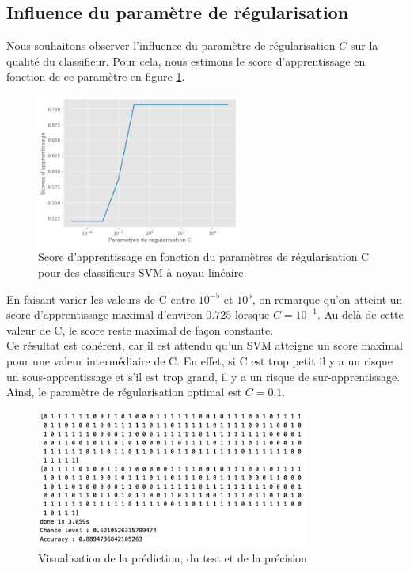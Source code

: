 \documentclass[a4paper,12pt]{article}
\begin{document}
\subsection{Influence du paramètre de régularisation}

Nous souhaitons observer l'influence du paramètre de régularisation $C$ sur la qualité du classifieur. 
Pour cela, nous estimons le score d'apprentissage en fonction de ce paramètre en figure \ref{fig : C}.

\begin{figure}[H]
    \centering
    \includegraphics[width=0.6\textwidth]{Images/erreur_prediction.png}
    \caption{Score d'apprentissage en fonction du paramètres de régularisation C pour des classifieurs SVM à noyau linéaire}\label{fig : C}
\end{figure}

En faisant varier les valeurs de C entre $10^{-5}$ et $10^{5}$, on remarque qu'on atteint un score d'apprentissage maximal d'environ $0.725$ lorsque $C=10^{-1}$.
Au delà de cette valeur de C, le score reste maximal de façon constante.\\
Ce résultat est cohérent, car il est attendu qu’un SVM atteigne un score maximal pour une valeur intermédiaire de 
C. En effet, si C est trop petit il y a un risque un sous-apprentissage et s'il est trop grand, il y a un risque de sur-apprentissage.\\
Ainsi, le paramètre de régularisation optimal est $C=0.1$.\\[0.5cm]


\begin{figure}[H]    
    \centering    
    \includegraphics[width=0.8\textwidth]{Images/label_prediction.png}
    \caption{Visualisation de la prédiction, du test et de la précision}\label{fig : precision}
\end{figure}
\end{document}
